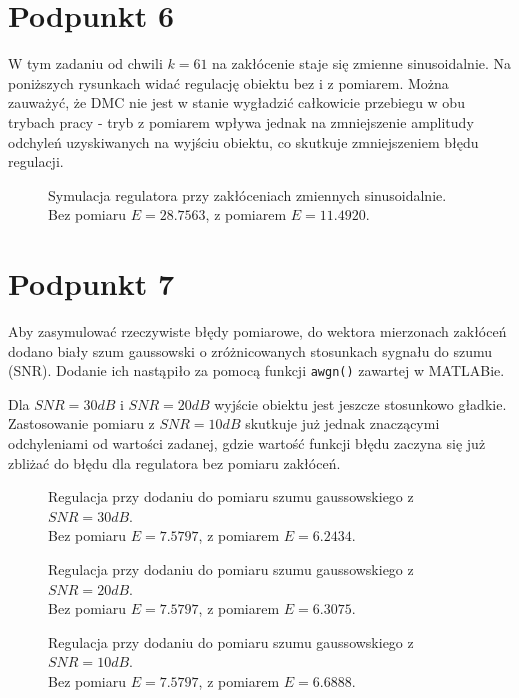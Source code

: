 \chapter{Podpunkt 6}
W tym zadaniu od chwili $ k = \num{61} $ na zakłócenie staje się zmienne sinusoidalnie. Na poniższych rysunkach widać regulację obiektu bez i z pomiarem. Można zauważyć, że DMC nie jest w stanie wygładzić całkowicie przebiegu w obu trybach pracy - tryb z pomiarem wpływa jednak na zmniejszenie amplitudy odchyleń uzyskiwanych na wyjściu obiektu, co skutkuje zmniejszeniem błędu regulacji. 

\begin{figure}[ht]
\centering

\caption{Symulacja regulatora przy zakłóceniach zmiennych sinusoidalnie.\\Bez pomiaru $ E = \num{28,7563} $, z pomiarem $ E = \num{11,4920} $.}
\label{Z6a}
\end{figure}

\chapter{Podpunkt 7}
Aby zasymulować rzeczywiste błędy pomiarowe, do wektora mierzonach zakłóceń dodano biały szum gaussowski o zróżnicowanych stosunkach sygnału do szumu (SNR). Dodanie ich nastąpiło za pomocą funkcji \verb|awgn()| zawartej w MATLABie.

Dla $ \mathit{SNR} = 30\mathit{dB} $ i $ \mathit{SNR} = 20\mathit{dB} $ wyjście obiektu jest jeszcze stosunkowo gładkie. Zastosowanie pomiaru z $ \mathit{SNR} = 10\mathit{dB} $ skutkuje już jednak znaczącymi odchyleniami od wartości zadanej, gdzie wartość funkcji błędu zaczyna się już zbliżać do błędu dla regulatora bez pomiaru zakłóceń.

\begin{figure}[ht]
	\centering
	
	\caption{Regulacja przy dodaniu do pomiaru szumu gaussowskiego z $ \mathit{SNR} = 30\mathit{dB} $.\\Bez pomiaru $ E = \num{7,5797} $, z pomiarem $ E = \num{6,2434}  $.}
	\label{Z7a}
\end{figure}
\begin{figure}[ht]
	\centering
	
	\caption{Regulacja przy dodaniu do pomiaru szumu gaussowskiego z $ \mathit{SNR} = 20\mathit{dB} $.\\Bez pomiaru $ E = \num{7,5797} $, z pomiarem $ E = \num{6,3075} $.}
	\label{Z7b}
\end{figure}
\begin{figure}[ht]
	\centering
	
	\caption{Regulacja przy dodaniu do pomiaru szumu gaussowskiego z $ \mathit{SNR} = 10\mathit{dB} $.\\Bez pomiaru $ E = \num{7,5797} $, z pomiarem $ E = \num{6,6888} $. }
	\label{Z7c}
\end{figure}
